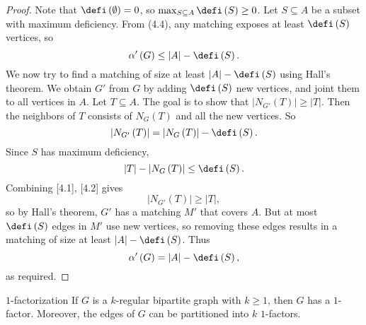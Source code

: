 \documentclass[co342]{subfiles}
\begin{document}
    \begin{proof}
        Note that $\defi\left( \emptyset \right)=0$, so $\max_{S\subseteq A}\defi\left( S \right)\geq 0$. Let $S\subseteq A$ be a subset with maximum deficiency. From (4.4), any matching exposes at least $\defi\left( S \right)$ vertices, so
        \begin{equation*}
            \alpha'\left( G \right)\leq\left| A \right|-\defi\left( S \right).
        \end{equation*}
        We now try to find a matching of size at least $\left| A \right|-\defi\left( S \right)$ using Hall's theorem. We obtain $G'$ from $G$ by adding $\defi\left( S \right)$ new vertices, and joint them to all vertices in $A$. Let $T\subseteq A$. The goal is to show that $\left| N_{G'}\left( T \right) \right|\geq \left| T \right|$. Then the neighbors of $T$ consists of $N_G\left( T \right)$ and all the new vertices. So
        \begin{equation}
            \left| N_{G'}\left( T \right) \right| = \left| N_G\left( T \right) \right|-\defi\left( S \right).
        \end{equation}
        Since $S$ has maximum deficiency,
        \begin{equation}
            \left| T \right|-\left| N_G\left( T \right) \right|\leq\defi\left( S \right).
        \end{equation}
        Combining [4.1], [4.2] gives
        \begin{equation*}
            \left| N_{G'}\left( T \right) \right|\geq\left| T \right|,
        \end{equation*}
        so by Hall's theorem, $G'$ has a matching $M'$ that covers $A$. But at most $\defi\left( S \right)$ edges in $M'$ use new vertices, so removing these edges results in a matching of size at least $\left| A \right|-\defi\left( S \right)$. Thus
        \begin{equation*}
            \alpha'\left( G \right)=\left| A \right|-\defi\left( S \right),
        \end{equation*}
        as required.
    \end{proof}

    \begin{cor}{$1$-factorization}
        If $G$ is a $k$-regular bipartite graph with $k\geq 1$, then $G$ has a $1$-factor. Moreover, the edges of $G$ can be partitioned into $k$ $1$-factors.
    \end{cor}	
\end{document}
